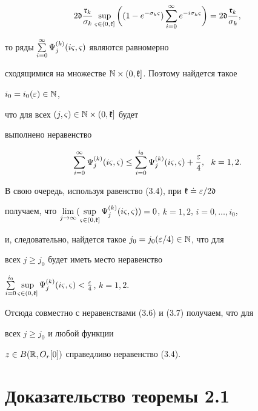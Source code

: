 \begin{pf}
\begin{equation}
2\frak d\frac{\frak r_{k}}{\sigma_{k}}\sup_{\vsg\in(0,\frak k]}


\bigg((1-e^{-\sigma_k\vsg})\sum\lt_{i=0}^{\infty}e^{-i\sigma_k\vsg}\bigg)=


2\frak d\frac{\frak r_{k}}{\sigma_{k}},


\end{equation}


то ряды $\sum\limits_{i=0}^{\infty}\Psi_{j}^{(k)}(i\varsigma,\varsigma)$ являются равномерно


сходящимися на множестве $\Bbb N\times(0,\frak k]$. Поэтому найдется такое


$i_{0}=i_{0}(\varepsilon)\in\Bbb N$,


что для всех $(j,\varsigma)\in\Bbb N\times(0,\frak k]$ будет


выполнено неравенство


\begin{equation}


\sum\lt_{i=0}^{\infty}\Psi_{j}^{(k)}(i\vsg,\vsg)\le


\sum\lt_{i=0}^{i_{0}}\Psi_{j}^{(k)}(i\vsg,\vsg)+\frac{\ve}{4},\ \ k=1,2.


\end{equation}


В свою очередь, используя равенство (3.4), при $\frak k\doteq\varepsilon/2\frak d$


получаем, что ${\lim\lt_{j\to\infty}(\sup\lt_{\vsg\in (0,\frak k]}


\Psi_{j}^{(k)}(i\vsg,\vsg))=0}$, $k=1,2$, $i=0,\dotsc,i_{0}$,


и, следовательно, найдется такое $j_{0}=j_{0}(\varepsilon/4)\in\Bbb N$, что для


всех $j\ge j_{0}$ будет иметь место неравенство


$\sum\lt_{i=0}^{i_{0}}\sup\lt_{\vsg\in


(0,\frak k]}\Psi_{j}^{(k)}(i\vsg,\vsg)<\frac{\ve}{4}$, $k=1,2$.


Отсюда совместно с неравенствами (3.6) и (3.7) получаем, что для


всех $j\ge j_{0}$ и любой функции


$z\in B(\Bbb R,O_{r}[0])$ справедливо неравенство (3.4).


\end{pf}





\section{Доказательство теоремы 2.1}





